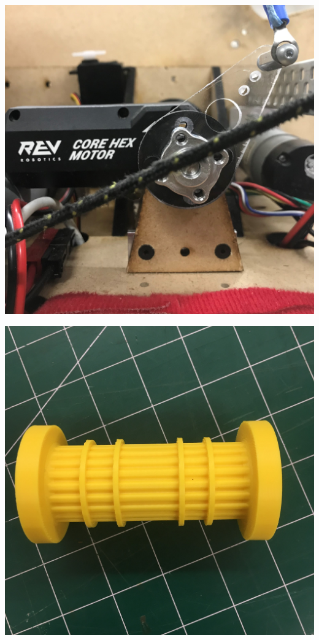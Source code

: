 \begin{multicols}{2}
\begin{center}
\end{center}
\begin{center}
        \includegraphics[width=.13\textwidth]{Design_Overview/timephoto18.jpg}
\end{center}
\begin{center}
        \includegraphics[width=.13\textwidth]{Design_Overview/timephoto19.png}
\end{center}


\end{multicols}